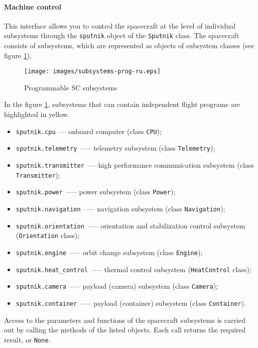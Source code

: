 \documentclass[12pt,a4paper]{article}
\begin{document}
\paragraph{Machine control}

This interface allows you to control the spacecraft at the level of individual subsystems through the \verb'sputnik' object of the \verb'Sputnik' class. The spacecraft consists of subsystems, which are represented as objects of subsystem classes (see figure \ref{Pic:subsystems-prog}).

\begin{figure}[tbh]
  \begin{center}
    \texttt{[image: images/subsystems-prog-ru.eps]}
    \caption{Programmable SC subsystems}
    \label{Pic:subsystems-prog}
  \end{center}
\end{figure}

In the figure \ref{Pic:subsystems-prog}, subsystems that can contain independent flight programs are highlighted in yellow.

\begin{itemize}
\item \verb'sputnik.cpu'~--- onboard computer (class \verb'CPU');
\item \verb'sputnik.telemetry'~--— telemetry subsystem (class \verb'Telemetry');
\item \verb'sputnik.transmitter'~--—high performance communication subsystem (class \verb'Transmitter');
\item \verb'sputnik.power'~--— power subsystem (class \verb'Power');
\item \verb'sputnik.navigation'~--— navigation subsystem (class \verb'Navigation');
\item \verb'sputnik.orientation'~--— orientation and stabilization control subsystem (\verb'Orientation' class);
\item \verb'sputnik.engine'~--— orbit change subsystem (class \verb'Engine');
\item \verb'sputnik.heat_control'~--— thermal control subsystem (\verb'HeatControl' class);
\item \verb'sputnik.camera'~--— payload (camera) subsystem (class \verb'Camera');
\item \verb'sputnik.container'~--— payload (container) subsystem (class \verb'Container').
\end{itemize}

Access to the parameters and functions of the spacecraft subsystems is carried out by calling the methods of the listed objects. Each call returns the required result, or \verb'None'.
\end{document}

